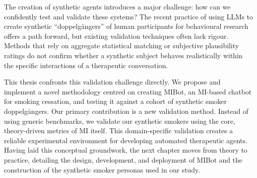The creation of synthetic agents introduces a major challenge: how can we confidently test and validate these systems? The recent practice of using LLMs to create synthetic ``doppelgängers'' of human participants for behavioural research offers a path forward, but existing validation techniques often lack rigour. Methods that rely on aggregate statistical matching or subjective plausibility ratings do not confirm whether a synthetic subject behaves realistically within the specific interactions of a therapeutic conversation.

This thesis confronts this validation challenge directly. We propose and implement a novel methodology centred on creating MIBot, an MI-based chatbot for smoking cessation, and testing it against a cohort of synthetic smoker doppelgängers. Our primary contribution is a new validation method. Instead of using generic benchmarks, we validate our synthetic smokers using the core, theory-driven metrics of MI itself.  This domain-specific validation creates a reliable experimental environment for developing automated therapeutic agents. Having laid this conceptual groundwork, the next chapter moves from theory to practice, detailing the design, development, and deployment of MIBot and the construction of the synthetic smoker personas used in our study.